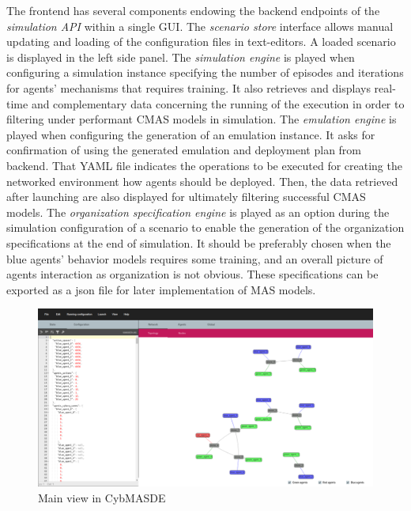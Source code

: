 \documentclass[sigconf]{aamas}
\begin{document}
The frontend has several components endowing the backend endpoints of the \textit{simulation API} within a single GUI.
The \textit{scenario store} interface allows manual updating and loading of the configuration files in text-editors. A loaded scenario is displayed in the left side panel.
The \textit{simulation engine} is played when configuring a simulation instance specifying the number of episodes and iterations for agents' mechanisms that requires training. It also retrieves and displays real-time and complementary data concerning the running of the execution in order to filtering under performant CMAS models in simulation.
The \textit{emulation engine} is played when configuring the generation of an emulation instance. It asks for confirmation of using the generated emulation and deployment plan from backend. That YAML file indicates the operations to be executed for creating the networked environment how agents should be deployed. Then, the data retrieved after launching are also displayed for ultimately filtering successful CMAS models.
The \textit{organization specification engine} is played as an option during the simulation configuration of a scenario to enable the generation of the organization specifications at the end of simulation. It should be preferably chosen when the blue agents' behavior models requires some training, and an overall picture of agents interaction as organization is not obvious. These specifications can be exported as a json file for later implementation of MAS models.

\begin{figure}[h]
  \centering
  \includegraphics[width=\linewidth]{CybMASDE_main_view.png}
  \caption{Main view in CybMASDE}
  \label{fig:screenshot}
\end{figure}
\end{document}
